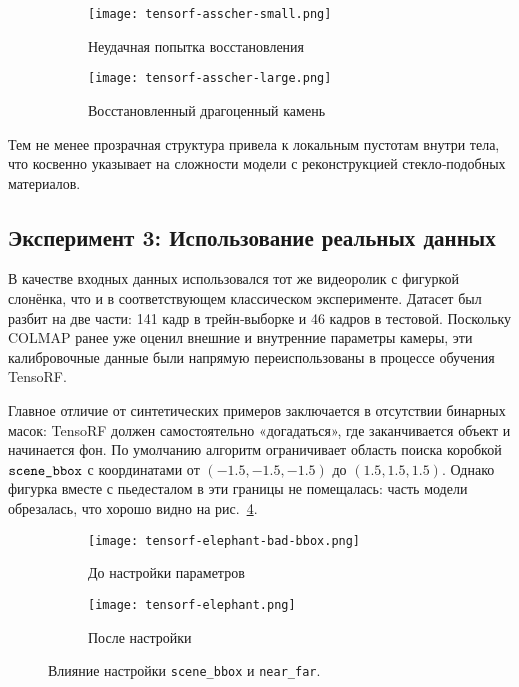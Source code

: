 \begin{figure}[h]
    \centering
    \begin{subfigure}[h]{0.45\textwidth}
      \centering
      \texttt{[image: tensorf-asscher-small.png]}
      \caption{Неудачная попытка восстановления}
      \label{fig:tensorf-asscher-small}
    \end{subfigure}\hfill
    \begin{subfigure}[h]{0.45\textwidth}
     \centering
      \texttt{[image: tensorf-asscher-large.png]}
      \caption{Восстановленный драгоценный камень}
      \label{fig:tensorf-asscher-large}
    \end{subfigure}
    \caption{}
\end{figure}

Тем не менее прозрачная структура
привела к локальным пустотам внутри тела,
что косвенно указывает на сложности модели
с реконструкцией стекло‑подобных материалов.

\subsection{Эксперимент 3: Использование реальных данных}

В качестве входных данных использовался тот же видеоролик с фигуркой
слонёнка, что и в соответствующем классическом эксперименте.
Датасет был разбит на две части: 141 кадр в трейн‑выборке
и 46 кадров в тестовой. Поскольку COLMAP ранее уже оценил
внешние и внутренние параметры камеры, эти калибровочные
данные были напрямую переиспользованы в процессе обучения TensoRF.

Главное отличие от синтетических примеров заключается в отсутствии
бинарных масок: TensoRF должен самостоятельно «догадаться»,
где заканчивается объект и начинается фон. По умолчанию
алгоритм ограничивает область поиска коробкой
$\verb|scene_bbox|$ с координатами от $(-1.5,-1.5,-1.5)$
до $(1.5,1.5,1.5)$. Однако фигурка вместе с пьедесталом в эти
границы не помещалась: часть модели обрезалась, что хорошо видно
на рис.~\ref{fig:tensorf_elephant_bad}.

\begin{figure}[h]
    \centering
    \begin{subfigure}[b]{0.45\textwidth}
        \centering
        \texttt{[image: tensorf-elephant-bad-bbox.png]}
        \caption{До настройки параметров}
        \label{fig:tensorf_elephant_bad}
    \end{subfigure}\hfill
    \begin{subfigure}[b]{0.45\textwidth}
        \centering
        \texttt{[image: tensorf-elephant.png]}
        \caption{После настройки}
        \label{fig:tensorf_eleph}
    \end{subfigure}
    \caption{Влияние настройки \texttt{scene\_bbox} и \texttt{near\_far}.}
\end{figure}

